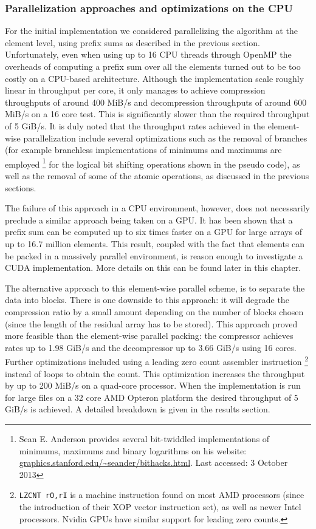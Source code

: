   \subsubsection{Parallelization approaches and optimizations on the CPU}
  For the initial implementation we considered parallelizing the algorithm at the element level, using prefix sums as described in the previous section. Unfortunately, even when using up to 16 CPU 
  threads through OpenMP the overheads of computing a prefix sum over all the elements turned out to be too costly on a CPU-based architecture. Although the implementation scale 
  roughly linear in throughput per core, it only manages to achieve compression throughputs of around 400 MiB/s and decompression throughputs of around 600 MiB/s on a 16 core test. This 
  is significantly slower than the required throughput of 5 GiB/s. It is duly noted that the throughput rates achieved in the element-wise parallelization 
  include several optimizations such as the removal of branches (for example branchless implementations of minimums and maximums are employed \footnote{Sean E. Anderson 
  provides several bit-twiddled implementations of minimums, maximums and binary logarithms on his website: \url{graphics.stanford.edu/~seander/bithacks.html}. Last accessed: 3 
  October 2013} for the logical bit shifting operations shown in the pseudo code), as well as the removal of some of the atomic operations, as discussed in the previous sections.
  
  The failure of this approach in a CPU environment, however, does not necessarily preclude a similar approach being taken on a GPU. It has been shown \cite{harris2007parallel} that a 
  prefix sum can be computed up to six times faster on a GPU for large arrays of up to 16.7 million elements. This result, coupled with the fact that elements can be packed in a massively
  parallel environment, is reason enough to investigate a CUDA implementation. More details on this can be found later in this chapter.
  
  The alternative approach to this element-wise parallel scheme, is to separate the data into blocks. There is one downside to this approach: it will degrade the compression
  ratio by a small amount depending on the number of blocks chosen (since the length of the residual array has to be stored). This approach proved more feasible than the 
  element-wise parallel packing: the compressor achieves rates up to 1.98 GiB/s and the decompressor up to 3.66 GiB/s using 16 cores. Further 
  optimizations included using a leading zero count assembler instruction \footnote{\texttt{LZCNT rO,rI} is a machine instruction found on most AMD processors (since the 
  introduction of their XOP vector instruction set), as well as newer Intel processors. Nvidia GPUs have similar support for leading zero counts.} instead of loops to obtain 
  the count. This optimization increases the throughput by up to 200 MiB/s on a quad-core processor. When the implementation is run for large files on a 32 core AMD Opteron platform
  the desired throughput of 5 GiB/s is achieved. A detailed breakdown is given in the results section.
